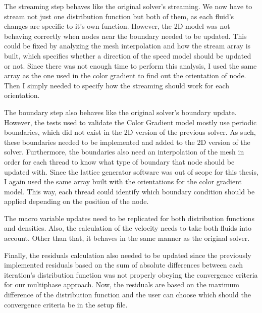 \documentclass[12pt, openany]{book}
\begin{document}
The streaming step behaves like the original solver's streaming. We now have to stream not just one distribution function but both of them, as each fluid's changes are specific to it's own function. However, the 2D model was not behaving correctly when nodes near the boundary needed to be updated. This could be fixed by analyzing the mesh interpolation and how the stream array is built, which specifies whether a direction of the speed model should be updated or not. Since there was not enough time to perform this analysis, I used the same array as the one used in the color gradient to find out the orientation of node. Then I simply needed to specify how the streaming should work for each orientation. \par
The boundary step also behaves like the original solver's boundary update. However, the tests used to validate the Color Gradient model mostly use periodic boundaries, which did not exist in the 2D version of the previous solver. As such, these boundaries needed to be implemented and added to the 2D version of the solver. Furthermore, the boundaries also need an interpolation of the mesh in order for each thread to know what type of boundary that node should be updated with. Since the lattice generator software was out of scope for this thesis, I again used the same array built with the orientations for the color gradient model. This way, each thread could identify which boundary condition should be applied depending on the position of the node. \par
The macro variable updates need to be replicated for both distribution functions and densities. Also, the calculation of the velocity needs to take both fluids into account. Other than that, it behaves in the same manner as the original solver. \par
Finally, the residuals calculation also needed to be updated since the previously implemented residuals based on the sum of absolute differences between each iteration's distribution function was not properly obeying the convergence criteria for our multiphase approach. Now, the residuals are based on the maximum difference of the distribution function and the user can choose which should the convergence criteria be in the setup file.    
\end{document}
